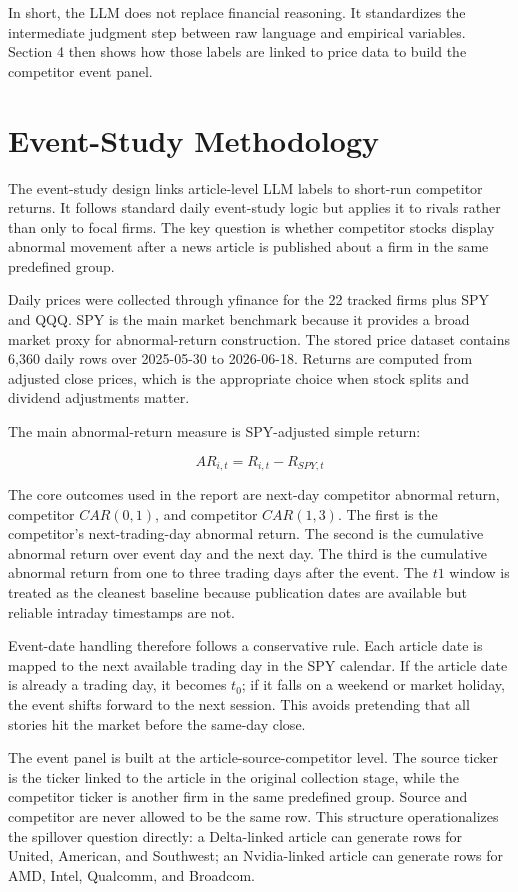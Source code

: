 \documentclass[11pt]{article}
\begin{document}
In short, the LLM does not replace financial reasoning. It standardizes the intermediate judgment step between raw language and empirical variables. Section 4 then shows how those labels are linked to price data to build the competitor event panel.

\section{Event-Study Methodology}

The event-study design links article-level LLM labels to short-run competitor returns. It follows standard daily event-study logic but applies it to rivals rather than only to focal firms. The key question is whether competitor stocks display abnormal movement after a news article is published about a firm in the same predefined group.

Daily prices were collected through yfinance for the 22 tracked firms plus SPY and QQQ. SPY is the main market benchmark because it provides a broad market proxy for abnormal-return construction. The stored price dataset contains 6,360 daily rows over 2025-05-30 to 2026-06-18. Returns are computed from adjusted close prices, which is the appropriate choice when stock splits and dividend adjustments matter.

The main abnormal-return measure is SPY-adjusted simple return:

\[
AR_{i,t} = R_{i,t} - R_{SPY,t}
\]

The core outcomes used in the report are next-day competitor abnormal return, competitor \(CAR(0,1)\), and competitor \(CAR(1,3)\). The first is the competitor's next-trading-day abnormal return. The second is the cumulative abnormal return over event day and the next day. The third is the cumulative abnormal return from one to three trading days after the event. The \(t1\) window is treated as the cleanest baseline because publication dates are available but reliable intraday timestamps are not.

Event-date handling therefore follows a conservative rule. Each article date is mapped to the next available trading day in the SPY calendar. If the article date is already a trading day, it becomes \(t_0\); if it falls on a weekend or market holiday, the event shifts forward to the next session. This avoids pretending that all stories hit the market before the same-day close.

The event panel is built at the article-source-competitor level. The source ticker is the ticker linked to the article in the original collection stage, while the competitor ticker is another firm in the same predefined group. Source and competitor are never allowed to be the same row. This structure operationalizes the spillover question directly: a Delta-linked article can generate rows for United, American, and Southwest; an Nvidia-linked article can generate rows for AMD, Intel, Qualcomm, and Broadcom.
\end{document}
